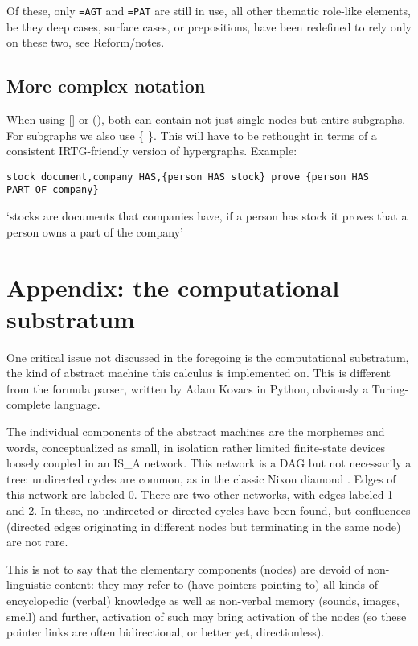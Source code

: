 \documentclass[11pt,bookmarks,bookmarksnumbered,naturalnames,plainpages=false,pdftex,colorlinks=true,urlcolor=blue,bookmarksdepth=subsection,plainpages=false]{paper}
\begin{document}
Of these, only {\tt =AGT} and {\tt =PAT} are still in use, all other thematic
role-like elements, be they deep cases, surface cases, or prepositions, have
been redefined to rely only on these two, see Reform/notes.

\subsection{More complex notation}\label{parens}

When using [] or (), both can contain not just single nodes but entire
subgraphs. For subgraphs we also use \{ \}. This will have to be rethought in
terms of a consistent IRTG-friendly version of hypergraphs. Example:

\begin{verbatim}
stock document,company HAS,{person HAS stock} prove {person HAS PART_OF company}
\end{verbatim}

\noindent
`stocks are documents that companies have, if a person has stock it proves
that a person owns a part of the company'


\section*{Appendix: the computational substratum}

One critical issue not discussed in the foregoing is the computational
substratum, the kind of abstract machine this calculus is implemented on. This
is different from the formula parser, written by Adam Kovacs in Python,
obviously a Turing-complete language.

The individual components of the abstract machines are the morphemes and words,
conceptualized as small, in isolation rather limited finite-state devices
loosely coupled in an IS\_A network. This network is a DAG but not necessarily a tree: 
undirected cycles are common, as in the classic Nixon diamond
\citep{Reiter:1983}. Edges of this network are labeled 0. There are two other
networks, with edges labeled 1 and 2. In these, no undirected or directed 
cycles have been found, but confluences (directed edges originating in
different nodes but terminating in the same node) are not rare. 

This is not to say that the elementary components (nodes) are devoid of
non-linguistic content: they may refer to (have pointers pointing to) all
kinds of encyclopedic (verbal) knowledge as well as non-verbal memory (sounds,
images, smell) and further, activation of such may bring activation of the
nodes (so these pointer links are often bidirectional, or better yet,
directionless). 
\end{document}
